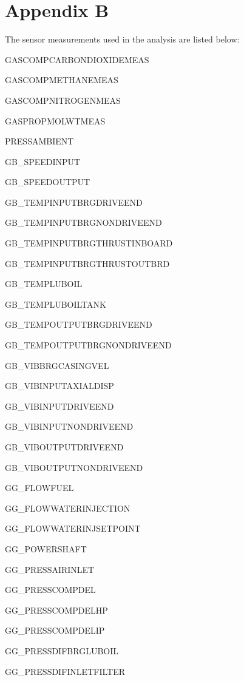 \documentclass[runningheads]{llncs}
\begin{document}
\newpage
\section*{Appendix B}

The sensor measurements used in the analysis are listed below:

\begin{multicols}{3}
	\begin{enumerate}
		\scriptsize{
			\item GASCOMPCARBONDIOXIDEMEAS
			\item GASCOMPMETHANEMEAS
			\item GASCOMPNITROGENMEAS
			\item GASPROPMOLWTMEAS
			\item PRESSAMBIENT
			\item GB\_SPEEDINPUT
			\item GB\_SPEEDOUTPUT
			\item GB\_TEMPINPUTBRGDRIVEEND
			\item GB\_TEMPINPUTBRGNONDRIVEEND
			\item GB\_TEMPINPUTBRGTHRUSTINBOARD
			\item GB\_TEMPINPUTBRGTHRUSTOUTBRD
			\item GB\_TEMPLUBOIL
			\item GB\_TEMPLUBOILTANK
			\item GB\_TEMPOUTPUTBRGDRIVEEND
			\item GB\_TEMPOUTPUTBRGNONDRIVEEND
			\item GB\_VIBBRGCASINGVEL
			\item GB\_VIBINPUTAXIALDISP
			\item GB\_VIBINPUTDRIVEEND
			\item GB\_VIBINPUTNONDRIVEEND
			\item GB\_VIBOUTPUTDRIVEEND
			\item GB\_VIBOUTPUTNONDRIVEEND
			\item GG\_FLOWFUEL
			\item GG\_FLOWWATERINJECTION
			\item GG\_FLOWWATERINJSETPOINT
			\item GG\_POWERSHAFT
			\item GG\_PRESSAIRINLET
			\item GG\_PRESSCOMPDEL
			\item GG\_PRESSCOMPDELHP
			\item GG\_PRESSCOMPDELIP
			\item GG\_PRESSDIFBRGLUBOIL
			\item GG\_PRESSDIFINLETFILTER
}
\end{enumerate}
\end{multicols}
\end{document}
